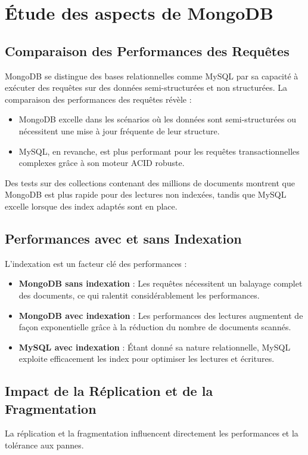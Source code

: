 \documentclass[a4paper,12pt]{report}
\begin{document}
\section{Étude des aspects de MongoDB}
\subsection{Comparaison des Performances des Requêtes}
MongoDB se distingue des bases relationnelles comme MySQL par sa capacité à exécuter des requêtes sur des données semi-structurées et non structurées. La comparaison des performances des requêtes révèle :
\begin{itemize}
    \item MongoDB excelle dans les scénarios où les données sont semi-structurées ou nécessitent une mise à jour fréquente de leur structure.
    \item MySQL, en revanche, est plus performant pour les requêtes transactionnelles complexes grâce à son moteur ACID robuste.
\end{itemize}
Des tests sur des collections contenant des millions de documents montrent que MongoDB est plus rapide pour des lectures non indexées, tandis que MySQL excelle lorsque des index adaptés sont en place.

\subsection{Performances avec et sans Indexation}
L'indexation est un facteur clé des performances :
\begin{itemize}
    \item \textbf{MongoDB sans indexation} : Les requêtes nécessitent un balayage complet des documents, ce qui ralentit considérablement les performances.
    \item \textbf{MongoDB avec indexation} : Les performances des lectures augmentent de façon exponentielle grâce à la réduction du nombre de documents scannés.
    \item \textbf{MySQL avec indexation} : Étant donné sa nature relationnelle, MySQL exploite efficacement les index pour optimiser les lectures et écritures.
\end{itemize}

\subsection{Impact de la Réplication et de la Fragmentation}
La réplication et la fragmentation influencent directement les performances et la tolérance aux pannes.
\end{document}
